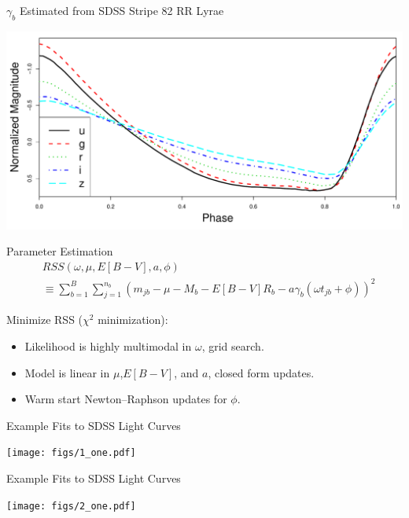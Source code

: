 \documentclass[12pt]{beamer}
\begin{document}
\begin{frame}{$\gamma_b$ Estimated from SDSS Stripe 82 RR Lyrae}

\begin{center}
\includegraphics[scale=.3]{figs/templates.pdf}
\end{center}

\end{frame}

\begin{frame}{Parameter Estimation}
\begin{align*}
&RSS(\omega,\mu,E[B-V],a,\phi) \\
 &\equiv\sum_{b=1}^B \sum_{j=1}^{n_b}\left(m_{jb} - \mu - M_b - E[B-V]R_b - a\gamma_b(\omega t_{jb} + \phi)\right)^2
\end{align*}


Minimize RSS ($\chi^2$ minimization):
\begin{itemize}
\item Likelihood is highly multimodal in $\omega$, grid search.
\item Model is linear in $\mu$,$E[B-V]$, and $a$, closed form updates.
\item Warm start Newton--Raphson updates for $\phi$.
\end{itemize}

\end{frame}

\begin{frame}{Example Fits to SDSS Light Curves}
\begin{center}
  \texttt{[image: figs/1\_one.pdf]}
\end{center}
\end{frame}

\begin{frame}{Example Fits to SDSS Light Curves}
\begin{center}
  \texttt{[image: figs/2\_one.pdf]}
\end{center}
\end{frame}
\end{document}
